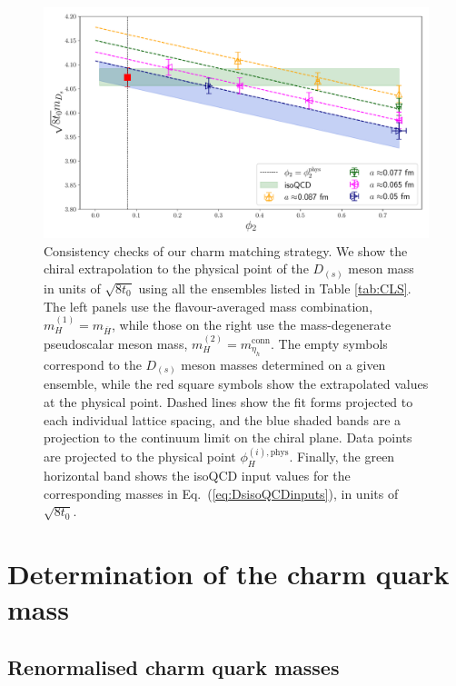 \begin{figure}[!t]
 	\includegraphics[scale=0.3]{./cap6/figs/matching/fit_phi2_mDs_etac.pdf}
 	\caption{Consistency checks of our charm matching strategy. We show the chiral extrapolation to the physical point of
	the ${D_{(s)}}$ meson mass in units of $\sqrt{8t_0}$ using all the ensembles listed in Table \ref{tab:CLS}.
	The left panels use the flavour-averaged mass combination, $m_H^{(1)}= m_{\overline{H}}$, while those on the right
	use the mass-degenerate pseudoscalar meson mass, $m_H^{(2)}=m_{\eta_h}^{\mathrm{conn}}$. The empty symbols correspond to the $D_{(s)}$ meson masses determined on a given ensemble,
	while the red square symbols show the extrapolated values at the physical point. Dashed lines
	show the fit forms projected to each individual lattice spacing, and the blue shaded bands
	are a projection to the continuum limit on the chiral plane. Data points are projected to the physical point $\phi_H^{(i),\mathrm{phys}}$. Finally, the green horizontal band shows
	the isoQCD input values for the corresponding masses in Eq.~(\ref{eq:DsisoQCDinputs}), in units of $\sqrt{8t_0}$.
        }
 	\label{fig:ds_matching} 
 \end{figure}


\section{Determination of the charm quark mass}
\label{sec:mc}

\subsection{Renormalised charm quark masses}


